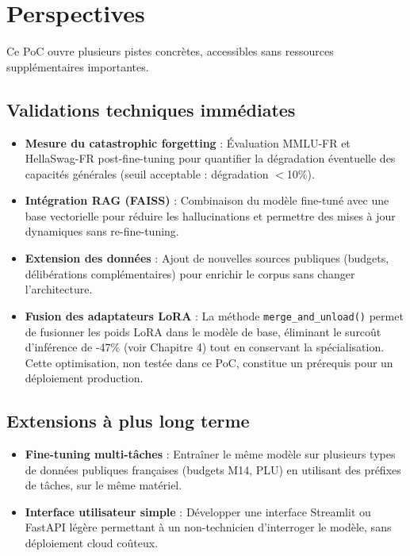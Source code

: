 \section{Perspectives}

Ce PoC ouvre plusieurs pistes concrètes, accessibles sans ressources supplémentaires importantes.

\subsection{Validations techniques immédiates}

\begin{itemize}
    \item \textbf{Mesure du catastrophic forgetting} : Évaluation MMLU-FR et HellaSwag-FR post-fine-tuning pour quantifier la dégradation éventuelle des capacités générales (seuil acceptable : dégradation $<$10\%).
    \item \textbf{Intégration RAG (FAISS)} : Combinaison du modèle fine-tuné avec une base vectorielle pour réduire les hallucinations et permettre des mises à jour dynamiques sans re-fine-tuning.
    \item \textbf{Extension des données} : Ajout de nouvelles sources publiques (budgets, délibérations complémentaires) pour enrichir le corpus sans changer l'architecture.
    \item \textbf{Fusion des adaptateurs LoRA} : La méthode \texttt{merge\_and\_unload()} permet de fusionner les poids LoRA dans le modèle de base, éliminant le surcoût d'inférence de -47\% (voir Chapitre 4) tout en conservant la spécialisation. Cette optimisation, non testée dans ce PoC, constitue un prérequis pour un déploiement production.
\end{itemize}

\subsection{Extensions à plus long terme}

\begin{itemize}
    \item \textbf{Fine-tuning multi-tâches} : Entraîner le même modèle sur plusieurs types de données publiques françaises (budgets M14, PLU) en utilisant des préfixes de tâches, sur le même matériel.
    \item \textbf{Interface utilisateur simple} : Développer une interface Streamlit ou FastAPI légère permettant à un non-technicien d'interroger le modèle, sans déploiement cloud coûteux.
\end{itemize}

